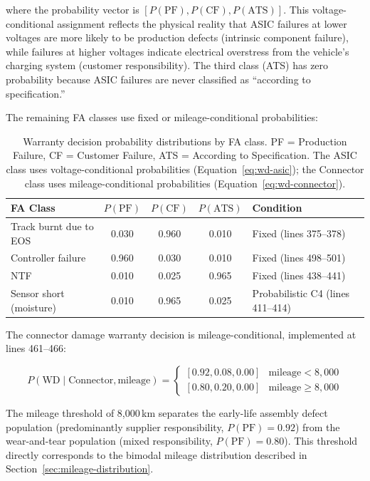 \documentclass[10pt,a4paper]{article}
\begin{document}
where the probability vector is $[P(\text{PF}), P(\text{CF}), P(\text{ATS})]$. This voltage-conditional assignment reflects the physical reality that ASIC failures at lower voltages are more likely to be production defects (intrinsic component failure), while failures at higher voltages indicate electrical overstress from the vehicle's charging system (customer responsibility). The third class (ATS) has zero probability because ASIC failures are never classified as ``according to specification.''

The remaining FA classes use fixed or mileage-conditional probabilities:

\begin{table}[H]
\centering
\caption{Warranty decision probability distributions by FA class. PF = Production Failure, CF = Customer Failure, ATS = According to Specification. The ASIC class uses voltage-conditional probabilities (Equation~\ref{eq:wd-asic}); the Connector class uses mileage-conditional probabilities (Equation~\ref{eq:wd-connector}).}
\label{tab:wd-probabilities}
\begin{tabular}{lcccR{3.5cm}}
\toprule
\textbf{FA Class} & $P(\text{PF})$ & $P(\text{CF})$ & $P(\text{ATS})$ & \textbf{Condition} \\
\midrule
Track burnt due to EOS & 0.030 & 0.960 & 0.010 & Fixed (lines 375--378) \\
Controller failure      & 0.960 & 0.030 & 0.010 & Fixed (lines 498--501) \\
NTF                     & 0.010 & 0.025 & 0.965 & Fixed (lines 438--441) \\
Sensor short (moisture) & 0.010 & 0.965 & 0.025 & Probabilistic C4 (lines 411--414) \\
\bottomrule
\end{tabular}
\end{table}

The connector damage warranty decision is mileage-conditional, implemented at lines 461--466:

\begin{equation}
P(\text{WD} \mid \text{Connector}, \text{mileage}) = \begin{cases}
[0.92, 0.08, 0.00] & \text{mileage} < 8{,}000 \\
[0.80, 0.20, 0.00] & \text{mileage} \geq 8{,}000
\end{cases}
\label{eq:wd-connector}
\end{equation}

The mileage threshold of 8{,}000\,km separates the early-life assembly defect population (predominantly supplier responsibility, $P(\text{PF}) = 0.92$) from the wear-and-tear population (mixed responsibility, $P(\text{PF}) = 0.80$). This threshold directly corresponds to the bimodal mileage distribution described in Section~\ref{sec:mileage-distribution}.
\end{document}
